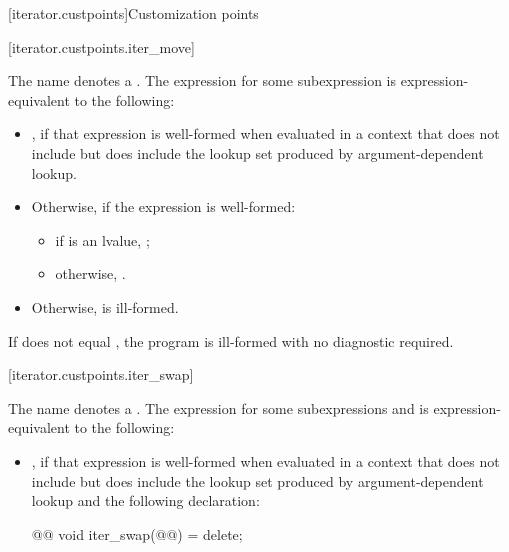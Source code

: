 \begin{addedblock}
[iterator.custpoints]{Customization points}

[iterator.custpoints.iter_move]{}

\pnum
The name  denotes a . The expression
 for some subexpression  is expression-equivalent to the
following:

\begin{itemize}
\item {}, if that expression
is well-formed when evaluated in a context that does not include
 but does include the
lookup set produced by argument-dependent lookup.

\item Otherwise, if the expression  is well-formed:
\begin{itemize}
\item if  is an lvalue, ;

\item otherwise, .
\end{itemize}

\item Otherwise,  is ill-formed.
\end{itemize}

\pnum
If  does not equal , the program is
ill-formed with no diagnostic required.

[iterator.custpoints.iter_swap]{}

\pnum
The name  denotes a . The expression
 for some subexpressions  and 
is expression-equivalent to the following:

\begin{itemize}
\item {}, if that expression is well-formed when
evaluated in a context that does not include  but does
include the lookup set produced by argument-dependent
lookup and the following declaration:
\begin{codeblock}
@@
void iter_swap(@@) = delete;
\end{codeblock}


\end{itemize}
\end{addedblock}
